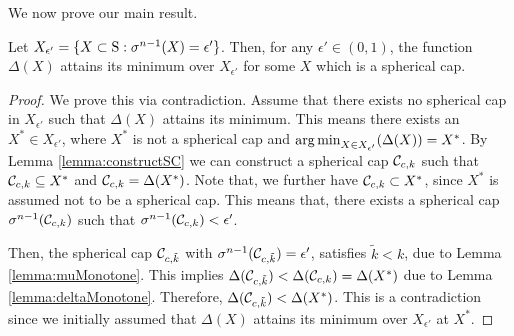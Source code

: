 %
%

We now prove our main result.
\begin{theorem}Let $X_{\epsilon'} = \{X \subset \text{S}: \sigma^{n-1}(X) = \epsilon'\}$. Then, for any $\epsilon' \in (0,1)$, the function $\Delta(X)$ attains its minimum over $X_{\epsilon'}$ for some $X$ which is a spherical cap.
\end{theorem}

\begin{proof}We prove this via contradiction. Assume that there exists no spherical cap in $X_{\epsilon'}$ such that $\Delta(X)$ attains its minimum. This means there exists an $X^* \in X_{\epsilon'}$, where $X^*$ is not a spherical cap and $\operatorname*{arg\,min}_{X \in X_{\epsilon'}}(\Delta(X))=X^*$. By Lemma \ref{lemma:constructSC} we can construct a spherical cap $\mathcal{C}_{c,k}$ such that $\mathcal{C}_{c,k} \subseteq X^*$ and $\mathcal{C}_{c,k} = \Delta(X^*)$. Note that, we further have $\mathcal{C}_{c,k} \subset X^*$, since $X^*$ is assumed not to be a spherical cap. This means that, there exists a spherical cap $\sigma^{n-1}(\mathcal{C}_{c,k})$ such that $\sigma^{n-1}(\mathcal{C}_{c,k}) < \epsilon'$. 

Then, the spherical cap $\mathcal{C}_{c, \tilde{k}}$ with $\sigma^{n-1}(\mathcal{C}_{c, \tilde{k}}) = \epsilon'$, satisfies $\tilde{k} < k$, due to Lemma \ref{lemma:muMonotone}. This implies $\Delta(\mathcal{C}_{c, \tilde{k}}) < \Delta(\mathcal{C}_{c, k}) = \Delta(X^*)$ due to Lemma \ref{lemma:deltaMonotone}. Therefore, $\Delta(\mathcal{C}_{c, \tilde{k}}) < \Delta(X^*)$. This is a contradiction since we initially assumed that $\Delta(X)$ attains its minimum over $X_{\epsilon'}$ at $X^*$.
\end{proof}

